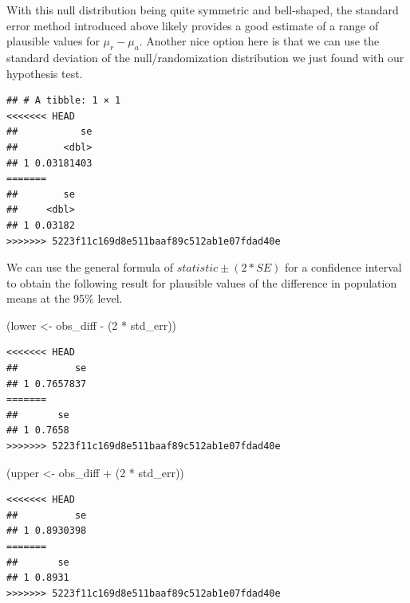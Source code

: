 \documentclass[]{tufte-book}
\newenvironment{Shaded}{\begin{snugshade}}{\end{snugshade}}
\newcommand{\KeywordTok}[1]{\textcolor[rgb]{0.13,0.29,0.53}{\textbf{{#1}}}}
\newcommand{\DataTypeTok}[1]{\textcolor[rgb]{0.13,0.29,0.53}{{#1}}}
\newcommand{\DecValTok}[1]{\textcolor[rgb]{0.00,0.00,0.81}{{#1}}}
\newcommand{\StringTok}[1]{\textcolor[rgb]{0.31,0.60,0.02}{{#1}}}
\newcommand{\NormalTok}[1]{{#1}}
\begin{document}
With this null distribution being quite symmetric and bell-shaped, the
standard error method introduced above likely provides a good estimate
of a range of plausible values for \(\mu_r - \mu_a\). Another nice
option here is that we can use the standard deviation of the
null/randomization distribution we just found with our hypothesis test.

\begin{Shaded}
\end{Shaded}

\begin{verbatim}
## # A tibble: 1 × 1
<<<<<<< HEAD
##           se
##        <dbl>
## 1 0.03181403
=======
##        se
##     <dbl>
## 1 0.03182
>>>>>>> 5223f11c169d8e511baaf89c512ab1e07fdad40e
\end{verbatim}

We can use the general formula of \(statistic \pm (2 * SE)\) for a
confidence interval to obtain the following result for plausible values
of the difference in population means at the 95\% level.

\begin{Shaded}
\begin{Highlighting}[]
\NormalTok{(lower <-}\StringTok{ }\NormalTok{obs_diff -}\StringTok{ }\NormalTok{(}\DecValTok{2} \NormalTok{*}\StringTok{ }\NormalTok{std_err))}
\end{Highlighting}
\end{Shaded}

\begin{verbatim}
<<<<<<< HEAD
##          se
## 1 0.7657837
=======
##       se
## 1 0.7658
>>>>>>> 5223f11c169d8e511baaf89c512ab1e07fdad40e
\end{verbatim}

\begin{Shaded}
\begin{Highlighting}[]
\NormalTok{(upper <-}\StringTok{ }\NormalTok{obs_diff +}\StringTok{ }\NormalTok{(}\DecValTok{2} \NormalTok{*}\StringTok{ }\NormalTok{std_err))}
\end{Highlighting}
\end{Shaded}

\begin{verbatim}
<<<<<<< HEAD
##          se
## 1 0.8930398
=======
##       se
## 1 0.8931
>>>>>>> 5223f11c169d8e511baaf89c512ab1e07fdad40e
\end{verbatim}
\end{document}
